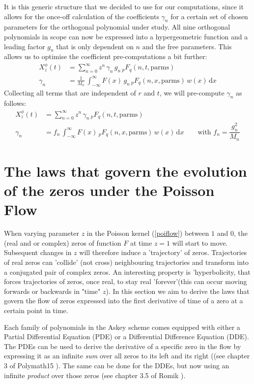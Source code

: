 \documentclass[a4paper,11pt,twoside]{amsart}
\newcommand{\verifiedeq}{=}
\newcommand{\verifiedeq}{\stackrel{\checkmark}{=}}
\begin{document}
It is this generic structure that we decided to use for our computations, since it allows for the once-off calculation of the coefficients $\gamma_n$ for a certain set of chosen parameters for the orthogonal polynomial under study. All nine orthogonal polynomials in scope can now be expressed into a hypergeometric function and a leading factor $g_n$ that is only dependent on $n$ and the free parameters. This allows us to optimise the coefficient pre-computations a bit further:
\begin{align}
 X^\phi_z(t) &\verifiedeq \sum_{n=0}^\infty z^n\,\gamma_n\,g_n\,{}_pF_q(n,t,\text{parms})\\
 \gamma_n &\verifiedeq  \frac{1}{M_n}\,\int_{-\infty}^\infty F(x)\, g_n\,{}_pF_q(n,x, \text{parms})\,w(x) \,\mathrm{d}x
\end{align} 
Collecting all terms that are independent of $r$ and $t$, we will pre-compute $\gamma_n$ as follows:
\begin{align}
 X^\phi_z(t) &\verifiedeq \sum_{n=0}^\infty z^n\,\gamma_n\,{}_pF_q(n,t, \text{parms}) \\
 \gamma_n &\verifiedeq  f_n\,\int_{-\infty}^\infty F(x)\,{}_pF_q(n,x,\text{parms})\,w(x) \,\mathrm{d}x \qquad \text{with } f_n = \dfrac{g_n^2}{M_n} 
\end{align} 
\pagebreak

\section{The laws that govern the evolution of the zeros under the Poisson Flow} \label{lawspoissonflow}
When varying parameter $z$ in the Poisson kernel (\ref{poiflow}) between $1$ and $0$, the (real and or complex) zeros of function $F$ at time $z=1$ will start to move. Subsequent changes in $z$ will therefore induce a 'trajectory' of zeros. Trajectories of real zeros can 'collide' (not cross) neighbouring trajectories and transform  into a conjugated pair of complex zeros. An interesting property is 'hyperbolicity, that forces trajectories of zeros, once real, to stay real 'forever'(this can occur moving forwards or backwards in "time" $z$). In this section we aim to derive the laws that govern the flow of zeros expressed into the first derivative of time of a zero at a certain point in time. 

Each family of polynomials in the Askey scheme comes equipped with either a Partial Differential Equation (PDE) or a Differential Difference Equation (DDE). The PDEs can be used to derive the derivative of a specific zero in the flow by expressing it as an infinite \textit{sum} over all zeros to its left and its right ((see chapter 3 of Polymath15 \cite{pol}). The same can be done for the DDEs, but now using an infinite \textit{product} over those zeros (see chapter 3.5 of Romik \cite{rom}). 
\end{document}
